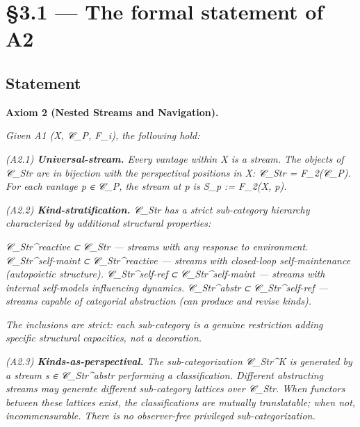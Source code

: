 \documentclass[11pt, openany]{book}
\newcommand{\sectionbreak}{\clearpage}
\begin{document}
\sectionbreak

\section{§3.1 --- The formal statement of A2}

\subsection{Statement}

\textbf{Axiom 2 (Nested Streams and Navigation).}

\textit{Given A1 (X, 𝒞\_\allowbreak{}P, F\_\allowbreak{}i), the following hold:}

\textit{(A2.1) \textbf{Universal-stream.} Every vantage within X is a stream. The objects of 𝒞\_\allowbreak{}Str are in bijection with the perspectival positions in X: 𝒞\_\allowbreak{}Str = F\_\allowbreak{}2(𝒞\_\allowbreak{}P). For each vantage p ∈ 𝒞\_\allowbreak{}P, the stream at p is S\_\allowbreak{}p := F\_\allowbreak{}2(X, p).}

\textit{(A2.2) \textbf{Kind-stratification.} 𝒞\_\allowbreak{}Str has a strict sub-category hierarchy characterized by additional structural properties:}

\textit{𝒞\_\allowbreak{}Str\textasciicircum{}reactive ⊂ 𝒞\_\allowbreak{}Str --- streams with any response to environment.}
\textit{𝒞\_\allowbreak{}Str\textasciicircum{}self-maint ⊂ 𝒞\_\allowbreak{}Str\textasciicircum{}reactive --- streams with closed-loop self-maintenance (autopoietic structure).}
\textit{𝒞\_\allowbreak{}Str\textasciicircum{}self-ref ⊂ 𝒞\_\allowbreak{}Str\textasciicircum{}self-maint --- streams with internal self-models influencing dynamics.}
\textit{𝒞\_\allowbreak{}Str\textasciicircum{}abstr ⊂ 𝒞\_\allowbreak{}Str\textasciicircum{}self-ref --- streams capable of categorial abstraction (can produce and revise kinds).}

\textit{The inclusions are strict: each sub-category is a genuine restriction adding specific structural capacities, not a decoration.}

\textit{(A2.3) \textbf{Kinds-as-perspectival.} The sub-categorization 𝒞\_\allowbreak{}Str\textasciicircum{}K is generated by a stream s ∈ 𝒞\_\allowbreak{}Str\textasciicircum{}abstr performing a classification. Different abstracting streams may generate different sub-category lattices over 𝒞\_\allowbreak{}Str. When functors between these lattices exist, the classifications are mutually translatable; when not, incommensurable. There is no observer-free privileged sub-categorization.}
\end{document}
